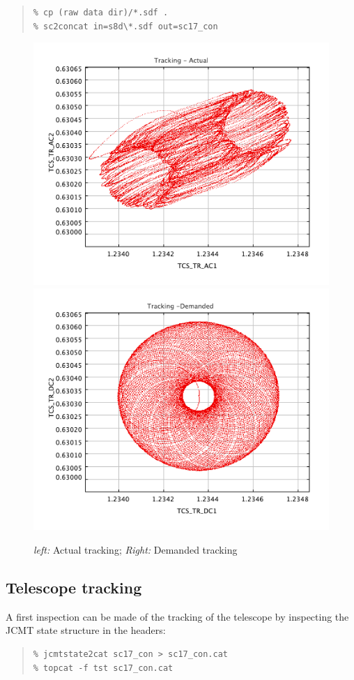 \documentclass[twoside,11pt]{article}
\newcommand{\xlabel}[1]{}
\renewcommand{\_}{\texttt{\symbol{95}}}
\newenvironment{myquote}{\begin{quote}\begin{small}}{\end{small}\end{quote}}
\begin{document}
\begin{myquote}
\begin{verbatim}
% cp (raw data dir)/*.sdf .
% sc2concat in=s8d\*.sdf out=sc17_con
\end{verbatim}
\end{myquote}

\begin{figure}
\begin{center}
\includegraphics[width=0.45\linewidth]{sc19_tracking_actual}
\hspace{0.03\linewidth}
\includegraphics[width=0.45\linewidth]{sc19_tracking_demand}
\caption{{\sl left:} Actual tracking; {\sl Right:} Demanded tracking }
\label{fig:tracking}
\end{center}
\end{figure}

\subsection{\xlabel{Tracking}Telescope tracking}
\label{sec:tracking}

A first inspection can be made of the tracking of the telescope by
inspecting the JCMT state structure in the headers:

\begin{myquote}
\begin{verbatim}
% jcmtstate2cat sc17_con > sc17_con.cat
% topcat -f tst sc17_con.cat
\end{verbatim}
\end{myquote}
\end{document}
